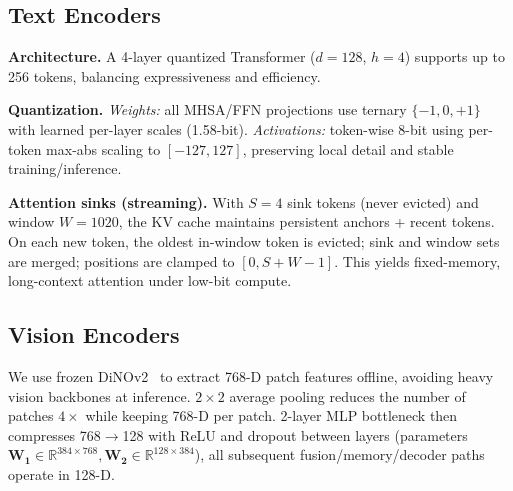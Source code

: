

\subsection{Text Encoders}


\textbf{Architecture.} A 4-layer quantized Transformer ($d{=}128$, $h{=}4$) supports up to 256 tokens, balancing expressiveness and efficiency.

\textbf{Quantization.} 
\emph{Weights:} all MHSA/FFN projections use ternary $\{-1,0,+1\}$ with learned per-layer scales (1.58-bit). 
\emph{Activations:} token-wise 8-bit using per-token max-abs scaling to $[-127,127]$, preserving local detail and stable training/inference.

\textbf{Attention sinks (streaming).} With $S{=}4$ sink tokens (never evicted) and window $W{=}1020$, the KV cache maintains persistent anchors + recent tokens. On each new token, the oldest in-window token is evicted; sink and window sets are merged; positions are clamped to $[0,S{+}W{-}1]$. This yields fixed-memory, long-context attention under low-bit compute.

\subsection{Vision Encoders}
We use frozen DiNOv2~\citep{oquab-dinov2-2024} to extract 768-D patch features offline, avoiding heavy vision backbones at inference. $2{\times}2$ average pooling reduces the number of patches $4{\times}$ while keeping 768-D per patch. 2-layer MLP bottleneck then compresses 768$\rightarrow$128 with ReLU and dropout between layers (parameters $\mathbf{W_1}\in\mathbb{R}^{384\times 768}, \mathbf{W_2}\in\mathbb{R}^{128\times 384}$), all subsequent fusion/memory/decoder paths operate in 128-D.

